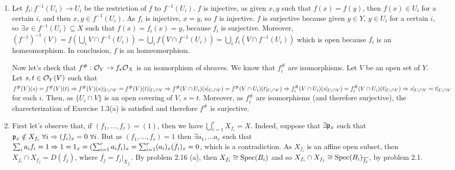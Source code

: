 \begin{sol}
	\begin{enumerate}[label=\alph*)]
		\item Let $f_i: f^{-1}(U_i) \to U_i$ be the restriction of $f$ to $f^{-1}(U_i)$. $f$ is injective, as given $x,y$ such that $f(x) = f(y)$, then $f(x) \in U_i$ for a certain $i$, and then $x,y \in f^{-1}(U_i)$. As $f_i$ is injective, $x = y$, so $f$ is injective. $f$ is surjective because given $y \in Y$, $y \in U_i$ for a certain $i$, so $\exists x \in f^{-1}(U_i) \subseteq X$ such that $f(x) = f_i(x) = y$, because $f_i$ is surjective. Moreover, $(f^{-1})^{-1}(V) = f(\bigcup_i V\cap f^{-1}(U_i)) = \bigcup_i f(V\cap f^{-1}(U_i)) = \bigcup_i f_i(V\cap f^{-1}(U_i))$ which is open because $f_i$ is an homeomorphism. In conclusion, $f$ is an homeomorphism.

		Now let's check that $f^{\#}: \mathcal{O}_Y \to f_* \mathcal{O}_X$ is an isomorphism of sheaves. We know that $f_i^{\#}$ are isomorphisms. Let $V$ be an open set of $Y$. Let $s,t \in \mathcal{O}_Y(V)$ such that $f^{\#}(V)(s) = f^{\#}(V)(t) \Rightarrow f^{\#}(V)(s)|_{U_i \cap V} = f^{\#}(V)(t)|_{U_i \cap V} \Rightarrow f^{\#}(V \cap U_i)(s|_{U_i \cap V}) =  f^{\#}(V \cap U_i)(t|_{U_i \cap V}) \Rightarrow f_i^{\#}(V \cap U_i)(s|_{U_i \cap V}) =  f_i^{\#}(V \cap U_i)(t|_{U_i \cap V}) \Rightarrow s|_{U_i \cap V} = t|_{U_i \cap V}$ for each $i$. Then, as $\{U_i \cap V\}$ is an open covering of $V$, $s = t$. Moreover, as $f_i^{\#}$ are isomorphisms (and therefore surjective), the charecterization of Exercise 1.3(a) is satisfied and therefore $f^{\#}$ is surjective.

		\item First let's observe that, if $(f_1, \dots, f_r) = (1)$, then we have $\bigcup_{i = 1}^r X_{f_i} = X$. Indeed, suppose that $\exists \mathfrak{p}_x$ such that $\mathfrak{p}_x \notin X_{f_i} \, \, \forall i \Rightarrow (f_i)_{x} = 0 \, \, \forall i$. But as $(f_1, \dots, f_r) = 1$ then $\exists a_1, \dots a_r$ such that $\sum_{i} a_i f_i = 1 \Rightarrow 1 = 1_x = (\sum_{i = 1}^r a_i f_i)_x = \sum_{i = 1}^r (a_i)_x(f_i)_x = 0$, which is a contradiction. As $X_{f_i}$ is an affine open subset, then $X_{f_i} \cap X_{f_j} = D(\overline{f_j})$, where $\overline{f_j} = f_j|_{X_{f_i}}$. By problem 2.16 (a), then $X_{f_i} \cong \mathrm{Spec}(B_i)$ and so $X_{f_i} \cap X_{f_j} \cong \mathrm{Spec}(B_i)_{\overline{f_j}}$, by problem 2.1.


\end{enumerate}
\end{sol}
